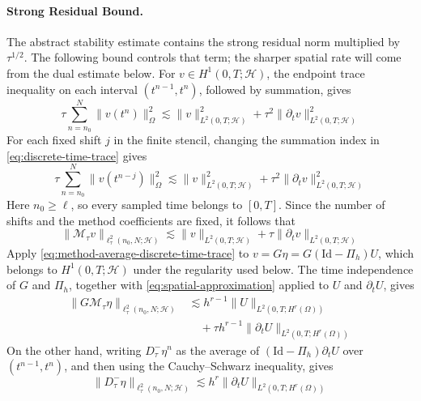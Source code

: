 \documentclass[11pt]{article}
\begin{document}
\paragraph{Strong Residual Bound.}
The abstract stability estimate contains the strong residual norm multiplied
by \(\tau^{1/2}\). The following bound controls that term; the sharper spatial
rate will come from the dual estimate below.
For \(v\in H^1(0,T;\mathcal H)\), the endpoint trace inequality on each
interval \((t^{n-1},t^n)\), followed by summation, gives
\begin{equation}
\tau\sum_{n=n_0}^{N}\|v(t^n)\|_{\Omega}^2
\lesssim \|v\|_{L^2(0,T;\mathcal H)}^2
+\tau^2\|\partial_tv\|_{L^2(0,T;\mathcal H)}^2
\label{eq:discrete-time-trace}
\end{equation}
For each fixed shift \(j\) in the finite stencil, changing the summation
index in \eqref{eq:discrete-time-trace} gives
\begin{equation}
\tau\sum_{n=n_0}^{N}\|v(t^{n-j})\|_{\Omega}^2
\lesssim \|v\|_{L^2(0,T;\mathcal H)}^2
+\tau^2\|\partial_tv\|_{L^2(0,T;\mathcal H)}^2
\label{eq:shifted-discrete-time-trace}
\end{equation}
Here \(n_0\ge\ell\), so every sampled time belongs to \([0,T]\). Since the
number of shifts and the method coefficients are fixed, it follows that
\begin{equation}
\|\mathcal M_{\tau}v\|_{\ell_{\tau}^2(n_0,N;\mathcal H)}
\lesssim \|v\|_{L^2(0,T;\mathcal H)}
+\tau\|\partial_tv\|_{L^2(0,T;\mathcal H)}
\label{eq:method-average-discrete-time-trace}
\end{equation}
Apply \eqref{eq:method-average-discrete-time-trace} to
\(v=G\eta=G(\mathrm{Id}-\Pi_h)U\), which belongs to
\(H^1(0,T;\mathcal H)\) under the regularity used below. The time
independence of \(G\) and \(\Pi_h\), together with
\eqref{eq:spatial-approximation} applied to \(U\) and \(\partial_tU\), gives
\begin{align}
\|G\mathcal M_{\tau}\eta\|_{\ell_{\tau}^2(n_0,N;\mathcal H)}
&\lesssim h^{r-1}\|U\|_{L^2(0,T;H^r(\Omega))} \label{eq:strong-residual-space-part}\\
&\quad+\tau h^{r-1}
\|\partial_tU\|_{L^2(0,T;H^r(\Omega))}
\label{eq:strong-residual-space-trace-part}
\end{align}
On the other hand, writing \(D_{\tau}^{-}\eta^n\) as the average of
\((\mathrm{Id}-\Pi_h)\partial_tU\) over \((t^{n-1},t^n)\), and then using the
Cauchy--Schwarz inequality, gives
\begin{equation}
\|D_{\tau}^{-}\eta\|_{\ell_{\tau}^2(n_0,N;\mathcal H)}
\lesssim h^r\|\partial_tU\|_{L^2(0,T;H^r(\Omega))}
\label{eq:strong-residual-time-part}
\end{equation}
\end{document}
